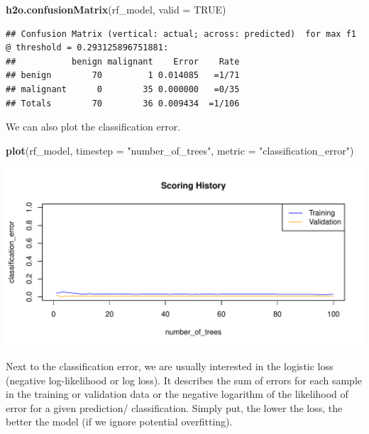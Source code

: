 \documentclass[]{article}
\newenvironment{Shaded}{\begin{snugshade}}{\end{snugshade}}
\newcommand{\KeywordTok}[1]{\textcolor[rgb]{0.13,0.29,0.53}{\textbf{{#1}}}}
\newcommand{\DataTypeTok}[1]{\textcolor[rgb]{0.13,0.29,0.53}{{#1}}}
\newcommand{\StringTok}[1]{\textcolor[rgb]{0.31,0.60,0.02}{{#1}}}
\newcommand{\OtherTok}[1]{\textcolor[rgb]{0.56,0.35,0.01}{{#1}}}
\newcommand{\NormalTok}[1]{{#1}}
\begin{document}
\begin{Shaded}
\begin{Highlighting}[]
\KeywordTok{h2o.confusionMatrix}\NormalTok{(rf_model, }\DataTypeTok{valid =} \OtherTok{TRUE}\NormalTok{)}
\end{Highlighting}
\end{Shaded}

\begin{verbatim}
## Confusion Matrix (vertical: actual; across: predicted)  for max f1 @ threshold = 0.293125896751881:
##           benign malignant    Error    Rate
## benign        70         1 0.014085   =1/71
## malignant      0        35 0.000000   =0/35
## Totals        70        36 0.009434  =1/106
\end{verbatim}

We can also plot the classification error.

\begin{Shaded}
\begin{Highlighting}[]
\KeywordTok{plot}\NormalTok{(rf_model,}
     \DataTypeTok{timestep =} \StringTok{"number_of_trees"}\NormalTok{,}
     \DataTypeTok{metric =} \StringTok{"classification_error"}\NormalTok{)}
\end{Highlighting}
\end{Shaded}

\begin{center}\includegraphics{webinar_code_files/figure-latex/unnamed-chunk-45-1} \end{center}

Next to the classification error, we are usually interested in the
logistic loss (negative log-likelihood or log loss). It describes the
sum of errors for each sample in the training or validation data or the
negative logarithm of the likelihood of error for a given prediction/
classification. Simply put, the lower the loss, the better the model (if
we ignore potential overfitting).
\end{document}
